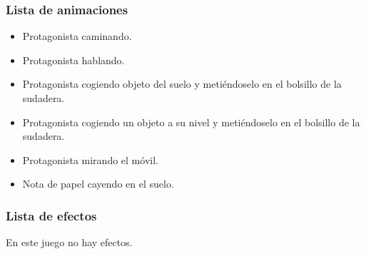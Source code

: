             \subsubsection{Lista de animaciones}
            \begin{itemize}
            \item Protagonista caminando.
            \item Protagonista hablando.
            \item Protagonista cogiendo objeto del suelo y metiéndoselo en el bolsillo de la sudadera.
            \item Protagonista cogiendo un objeto a su nivel y metiéndoselo en el bolsillo de la sudadera.
            \item Protagonista mirando el móvil.
            \item Nota de papel cayendo en el suelo.
            \end{itemize}
            
            \subsubsection{Lista de efectos}
            En este juego no hay efectos.
            
